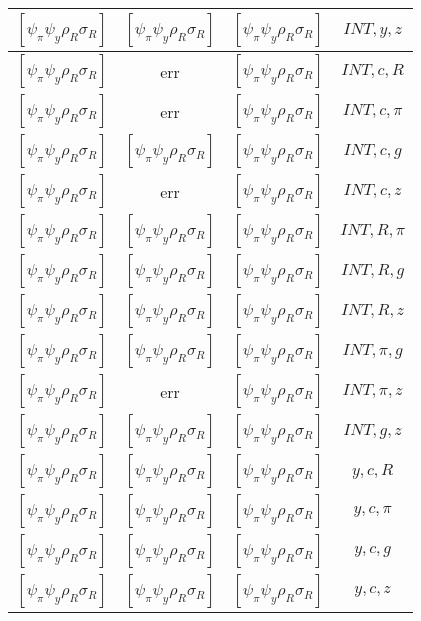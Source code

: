 \documentclass[a4paper,10pt]{article}
\begin{document}
\begin{longtable}{|c|c|c|c|}
\hline
$[\psi_\pi \psi_y \rho_R \sigma_R ]$ & $[\psi_\pi \psi_y \rho_R \sigma_R ]$ & $[\psi_\pi \psi_y \rho_R \sigma_R ]$ & ${INT},{y},{z}$ \\
\hline
$[\psi_\pi \psi_y \rho_R \sigma_R ]$ & err & $[\psi_\pi \psi_y \rho_R \sigma_R ]$ & ${INT},{c},{R}$ \\
\hline
$[\psi_\pi \psi_y \rho_R \sigma_R ]$ & err & $[\psi_\pi \psi_y \rho_R \sigma_R ]$ & ${INT},{c},{\pi}$ \\
\hline
$[\psi_\pi \psi_y \rho_R \sigma_R ]$ & $[\psi_\pi \psi_y \rho_R \sigma_R ]$ & $[\psi_\pi \psi_y \rho_R \sigma_R ]$ & ${INT},{c},{g}$ \\
\hline
$[\psi_\pi \psi_y \rho_R \sigma_R ]$ & err & $[\psi_\pi \psi_y \rho_R \sigma_R ]$ & ${INT},{c},{z}$ \\
\hline
$[\psi_\pi \psi_y \rho_R \sigma_R ]$ & $[\psi_\pi \psi_y \rho_R \sigma_R ]$ & $[\psi_\pi \psi_y \rho_R \sigma_R ]$ & ${INT},{R},{\pi}$ \\
\hline
$[\psi_\pi \psi_y \rho_R \sigma_R ]$ & $[\psi_\pi \psi_y \rho_R \sigma_R ]$ & $[\psi_\pi \psi_y \rho_R \sigma_R ]$ & ${INT},{R},{g}$ \\
\hline
$[\psi_\pi \psi_y \rho_R \sigma_R ]$ & $[\psi_\pi \psi_y \rho_R \sigma_R ]$ & $[\psi_\pi \psi_y \rho_R \sigma_R ]$ & ${INT},{R},{z}$ \\
\hline
$[\psi_\pi \psi_y \rho_R \sigma_R ]$ & $[\psi_\pi \psi_y \rho_R \sigma_R ]$ & $[\psi_\pi \psi_y \rho_R \sigma_R ]$ & ${INT},{\pi},{g}$ \\
\hline
$[\psi_\pi \psi_y \rho_R \sigma_R ]$ & err & $[\psi_\pi \psi_y \rho_R \sigma_R ]$ & ${INT},{\pi},{z}$ \\
\hline
$[\psi_\pi \psi_y \rho_R \sigma_R ]$ & $[\psi_\pi \psi_y \rho_R \sigma_R ]$ & $[\psi_\pi \psi_y \rho_R \sigma_R ]$ & ${INT},{g},{z}$ \\
\hline
$[\psi_\pi \psi_y \rho_R \sigma_R ]$ & $[\psi_\pi \psi_y \rho_R \sigma_R ]$ & $[\psi_\pi \psi_y \rho_R \sigma_R ]$ & ${y},{c},{R}$ \\
\hline
$[\psi_\pi \psi_y \rho_R \sigma_R ]$ & $[\psi_\pi \psi_y \rho_R \sigma_R ]$ & $[\psi_\pi \psi_y \rho_R \sigma_R ]$ & ${y},{c},{\pi}$ \\
\hline
$[\psi_\pi \psi_y \rho_R \sigma_R ]$ & $[\psi_\pi \psi_y \rho_R \sigma_R ]$ & $[\psi_\pi \psi_y \rho_R \sigma_R ]$ & ${y},{c},{g}$ \\
\hline
$[\psi_\pi \psi_y \rho_R \sigma_R ]$ & $[\psi_\pi \psi_y \rho_R \sigma_R ]$ & $[\psi_\pi \psi_y \rho_R \sigma_R ]$ & ${y},{c},{z}$ \\

\end{longtable}
\end{document}
